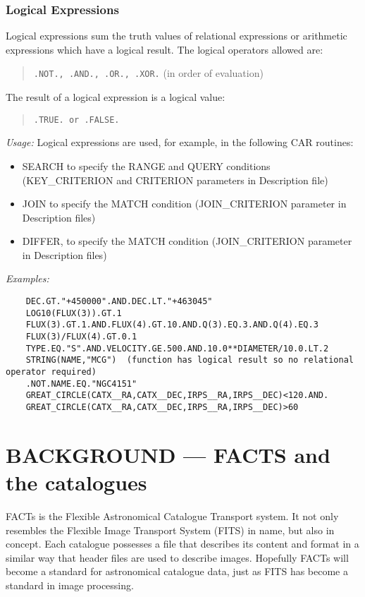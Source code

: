 \subsubsection {Logical Expressions}
Logical expressions sum the truth values of relational expressions or
arithmetic expressions which have a logical result.
The logical operators allowed are:
\begin{quote}
{\tt .NOT., .AND., .OR., .XOR.} (in order of evaluation)
\end{quote}
The result of a logical expression is a logical value:
\begin{quote}
{\tt .TRUE. or .FALSE.}
\end{quote}

{\em Usage:} Logical expressions are used, for example, in the following 
CAR routines:
\begin{itemize}
\item SEARCH to specify the RANGE and QUERY conditions
(KEY\_CRITERION and CRITERION parameters in Description file)
\item JOIN to specify the MATCH condition (JOIN\_CRITERION 
parameter in Description files)
\item DIFFER, to specify the MATCH condition (JOIN\_CRITERION 
parameter in Description files)
\end{itemize}
{\em Examples:}
\begin{verbatim}
    DEC.GT."+450000".AND.DEC.LT."+463045"
    LOG10(FLUX(3)).GT.1
    FLUX(3).GT.1.AND.FLUX(4).GT.10.AND.Q(3).EQ.3.AND.Q(4).EQ.3
    FLUX(3)/FLUX(4).GT.0.1
    TYPE.EQ."S".AND.VELOCITY.GE.500.AND.10.0**DIAMETER/10.0.LT.2
    STRING(NAME,"MCG")  (function has logical result so no relational operator required)
    .NOT.NAME.EQ."NGC4151"
    GREAT_CIRCLE(CATX__RA,CATX__DEC,IRPS__RA,IRPS__DEC)<120.AND.
    GREAT_CIRCLE(CATX__RA,CATX__DEC,IRPS__RA,IRPS__DEC)>60
\end{verbatim}

\section {BACKGROUND --- FACTS and the catalogues}

FACTs is the Flexible Astronomical Catalogue Transport system.
It not only resembles the Flexible Image Transport System (FITS) in name, but
also in concept.
Each catalogue possesses a file that describes its content and format in a
similar way that header files are used to describe images.
Hopefully FACTs will become a standard for astronomical catalogue data, just as
FITS has become a standard in image processing.
